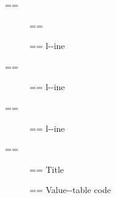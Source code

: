 \documentclass{book}
\makeatletter
\newenvironment{Texinfopreformatted}{%
  \par\GNUTobeylines\obeyspaces\frenchspacing\parskip=\z@\parindent=\z@}{}
{\catcode`\^^M=13 \gdef\GNUTobeylines{\catcode`\^^M=13 \def^^M{\null\par}}}
\newenvironment{Texinfoindented}{\begin{list}{}{}\item\relax}{\end{list}}
\renewcommand{\_}{\Texinfounderscore\discretionary{}{}{}}
\makeatother
\begin{document}
{{\begin{Texinfoindented}
\begin{Texinfopreformatted}
\end{Texinfopreformatted}
\begin{description}
\item[] \begin{Texinfopreformatted}%
\ttfamily \end{Texinfopreformatted}
\item[{\parbox[b]{\linewidth}{%
\textbf{a--strong}}}]
\begin{Texinfopreformatted}%
\ttfamily l{-}{-}ine
\end{Texinfopreformatted}
\end{description}
\begin{Texinfopreformatted}%
\ttfamily 
\end{Texinfopreformatted}
\begin{description}
\item[{\parbox[b]{\linewidth}{%
a--asis\\
\index[cp]{a--asis@\texttt{a{-}{-}asis}}%
b
\index[cp]{b@\texttt{b}}%
}}]
\begin{Texinfopreformatted}%
\ttfamily l{-}{-}ine
\end{Texinfopreformatted}
\end{description}
\begin{Texinfopreformatted}%
\ttfamily 
\end{Texinfopreformatted}
\begin{description}
\item[{\parbox[b]{\linewidth}{%
\emph{a}\\
\index[fn]{a@\texttt{a}}%
\index[cp]{index entry between item and itemx@index entry between item and itemx}%
\emph{b}
\index[fn]{b@\texttt{b}}%
}}]
\begin{Texinfopreformatted}%
\ttfamily l{-}{-}ine
\end{Texinfopreformatted}
\end{description}
\begin{Texinfopreformatted}%
\ttfamily 
\end{Texinfopreformatted}
\begin{description}
\item[] \begin{Texinfopreformatted}%
\ttfamily Title
\end{Texinfopreformatted}
\item[{\parbox[b]{\linewidth}{%
\texttt{a{-}{-}code}}}]
\begin{Texinfopreformatted}%
\ttfamily Value{-}{-}table code
\end{Texinfopreformatted}

\end{description}
\end{Texinfoindented}}}
\end{document}

